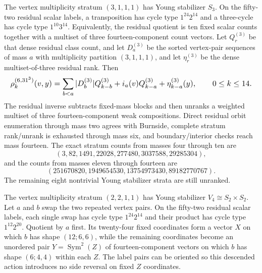 \documentclass{article}
\newcommand{\fitmath}[1]{\resizebox{0.99\linewidth}{!}{$\displaystyle #1$}}
\begin{document}
The vertex multiplicity stratum $(3,1,1,1)$ has Young stabilizer $S_3$.
On the fifty-two residual scalar labels, a transposition has cycle type
$1^{24}2^{14}$ and a three-cycle has cycle type $1^{10}3^{14}$. Equivalently,
the residual quotient is ten fixed scalar counts together with a multiset of
three fourteen-component count vectors. Let $Q_r^{(3)}$ be that dense
residual class count, and let $D_a^{(3)}$ be the sorted vertex-pair sequences
of mass $a$ with
multiplicity partition $(3,1,1,1)$, and let $\eta_r^{(3)}$ be the dense
multiset-of-three residual rank. Then
\begin{equation}
  \fitmath{%
    \rho^{(6,3 1^3)}_k(v,y)
      =\sum_{b<a}|D_b^{(3)}|Q_{k-b}^{(3)}
       +i_a(v)Q_{k-a}^{(3)}+\eta_{k-a}^{(3)}(y),
    \qquad 0\leq k\leq14.
  }
  \label{eq:optimization-crazy-sextuple-s6-s3-vertex-ranking}
\end{equation}
The residual inverse subtracts fixed-mass blocks and then unranks a weighted
multiset of three fourteen-component weak compositions. Direct residual orbit
enumeration through mass two agrees with Burnside, complete stratum rank/unrank
is exhausted through mass six, and boundary/interior checks reach mass
fourteen. The exact stratum counts from masses four through ten are
\[
  (3,82,1491,22028,277480,3037588,29285304),
\]
and the counts from masses eleven through fourteen are
\[
  (251670820,1949654530,13754973430,89182770767).
\]
The remaining eight nontrivial Young stabilizer strata are still unranked.

The vertex multiplicity stratum $(2,2,1,1)$ has Young stabilizer
$V_4\cong S_2\times S_2$. Let $a$ and $b$ swap the two repeated vertex pairs.
On the fifty-two residual scalar labels, each single swap has cycle type
$1^{24}2^{14}$ and their product has cycle type $1^{12}2^{20}$. Quotient by
$a$ first. Its twenty-four fixed coordinates form a vector $X$ on which $b$
has shape $(12;6,6)$, while the remaining coordinates become an unordered pair
$Y=\operatorname{Sym}^2(Z)$ of fourteen-component vectors on which $b$ has
shape $(6;4,4)$ within each $Z$. The label pairs can be oriented so this
descended action introduces no side reversal on fixed $Z$ coordinates.
\end{document}
